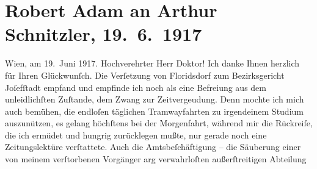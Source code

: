 

         
         \newcommand{\erwaehntePersonen}{Personen: Richard Beer, Alexandre père Dumas, Aemilius Hacker, Viktor Franz Patzner, Maria Pollak}
         \newcommand{\erwaehnteInstitutionen}{Institutionen: Bezirksgericht Wien Josefstadt}
         \newcommand{\erwaehnteOrte}{Orte: Steiermark, VIII., Josefstadt, Wien, XXI., Floridsdorf, Zistersdorf}
         \newcommand{\erwaehnteWerke}{Werke: Das Ende des Judas, Meine Memoiren}
               \section[Robert Adam an Arthur Schnitzler, 19. 6. 1917]{ Robert Adam an Arthur Schnitzler, 19. 6. 1917}\nopagebreak{}\rehead{ }\begin{ledgroupsized}[t]{13cm}\normalsize\beginnumbering \toendnotes[C]{\smallbreak\pagebreak[2]} 
\toendnotes[C]{\smallbreak}\pstart
           \raggedleft{}{\pb}Wien, am 19. Juni 1917. \pend
           \pstart{}Hochverehrter Herr Doktor!\pend\pstart
           Ich danke Ihnen herzlich für Ihren Glückwunſch. Die Verſetzung von Floridsdorf zum Bezirksgericht Joſefſtadt empfand und empfinde ich noch als eine Befreiung aus dem unleidlichſten
                    Zuſtande, dem Zwang zur Zeitvergeudung. Denn mochte ich mich auch bemühen, die
                    endloſen täglichen Tramwayfahrten zu irgendeinem Studium auszunützen, es gelang
                    höchſtens bei der Morgenfahrt, während mir die Rückreiſe, die ich ermüdet und
                    hungrig zurücklegen mußte, nur gerade noch eine Zeitungslektüre {\pb}verſtattete. Auch die Amtsbeſchäftigung – die
                    Säuberung einer von meinem verſtorbenen Vorgänger arg verwahrloſten außerſtreitigen Abteilung

\end{ledgroupsized}
